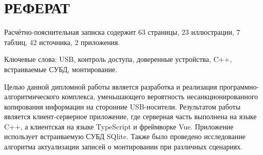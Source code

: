 \chapter*{РЕФЕРАТ}

Расчётно-пояснительная записка содержит $63$ страницы, $23$ иллюстрации, $7$ таблиц, $42$ источника, $2$ приложения.

Ключевые слова: USB, контроль доступа, доверенные устройства, C++, встраиваемые СУБД, монтирование.

Целью данной дипломной работы является разработка и реализация программно-алгоритмического
комплекса, уменьшающего вероятность несанкционированного копирования информации на сторонние USB-носители.
Результатом работы является клиент-серверное приложение, где серверная часть выполнена на языке C++,
а клиентская на языке TypeScript и фреймворке Vue. Приложение использует встраиваемую СУБД SQlite. Также 
было проведено исследование алгоритма актуализации записей о монтировании при различных сценариях.